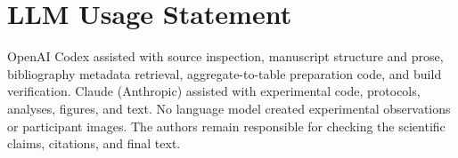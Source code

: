 \section*{LLM Usage Statement}
OpenAI Codex assisted with source inspection, manuscript structure and prose, bibliography metadata retrieval, aggregate-to-table preparation code, and build verification.
Claude (Anthropic) assisted with experimental code, protocols, analyses, figures, and text.
No language model created experimental observations or participant images.
The authors remain responsible for checking the scientific claims, citations, and final text.
